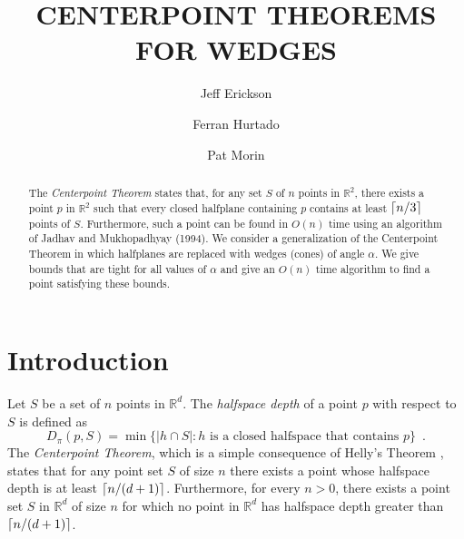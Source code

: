 \documentclass[lotsofwhite]{patmorin}
\title{\MakeUppercase{Centerpoint Theorems for Wedges}}
\author{Jeff Erickson \and
	Ferran Hurtado \and
	Pat Morin}
\date{}
\begin{document}
\maketitle

\begin{abstract}
The \emph{Centerpoint Theorem} states that, for any set $S$ of $n$
points in $\mathbb{R}^2$, there exists a point $p$ in $\mathbb{R}^2$
such that every closed halfplane containing $p$ contains at least
$\left\lceil n/3 \right\rceil$ points of $S$. Furthermore, such a point can be found in
$O(n)$ time using an algorithm of Jadhav and Mukhopadhyay (1994).  We
consider a generalization of the Centerpoint Theorem in which
halfplanes are replaced with wedges (cones) of angle $\alpha$.  We
give bounds that are tight for all values of $\alpha$ and give an
$O(n)$ time algorithm to find a point satisfying these bounds.
\end{abstract}

\noindent{}

\section{Introduction}

Let $S$ be a set of $n$ points in $\mathbb{R}^d$.  The \emph{halfspace
depth} \cite{t75} of a point $p$ with respect to $S$ is defined as
\[
D_\pi(p,S) = 
   \min\{|h\cap S| : \mbox{$h$ is a closed halfspace that contains $p$} \}
    \enspace .
\]
The \emph{Centerpoint Theorem}, which is a simple consequence of
Helly's Theorem \cite{e93}, states that for any point set $S$ of size
$n$ there exists a point whose halfspace depth is at least
$\left\lceil n/(d+1) \right\rceil$.  Furthermore, for every $n>0$, there exists a point
set $S$ in $\mathbb{R}^d$ of size $n$ for which no point in
$\mathbb{R}^d$ has halfspace depth greater than $\left\lceil n/(d+1) \right\rceil$. 
\end{document}
